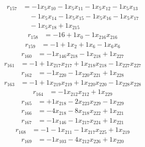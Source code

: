 \[\begin{aligned}
r_{157} &= - 1 x_{5} x_{10} - 1 x_{5} x_{11} - 1 x_{5} x_{12} - 1 x_{5} x_{13} \\
 &\quad - 1 x_{5} x_{14} - 1 x_{5} x_{15} - 1 x_{5} x_{16} - 1 x_{5} x_{17} \\
 &\quad - 1 x_{5} x_{18} + 1 x_{215}
\end{aligned}\]
\[\begin{aligned}
r_{158} &= - 16 + 1 x_{0} - 1 x_{216} x_{216}
\end{aligned}\]
\[\begin{aligned}
r_{159} &= - 1 + 1 x_{2} + 1 x_{6} - 1 x_{6} x_{6}
\end{aligned}\]
\[\begin{aligned}
r_{160} &= - 1 x_{146} x_{218} - 1 x_{218} + 1 x_{227}
\end{aligned}\]
\[\begin{aligned}
r_{161} &= - 1 + 1 x_{217} x_{217} + 1 x_{218} x_{218} - 1 x_{227} x_{227}
\end{aligned}\]
\[\begin{aligned}
r_{162} &= - 1 x_{220} - 1 x_{220} x_{221} + 1 x_{228}
\end{aligned}\]
\[\begin{aligned}
r_{163} &= - 1 + 1 x_{219} x_{219} + 1 x_{220} x_{220} - 1 x_{228} x_{228}
\end{aligned}\]
\[\begin{aligned}
r_{164} &= - 1 x_{212} x_{212} + 1 x_{229}
\end{aligned}\]
\[\begin{aligned}
r_{165} &= + 1 x_{218} - 2 x_{223} x_{229} - 1 x_{229}
\end{aligned}\]
\[\begin{aligned}
r_{166} &= - 4 x_{218} - 8 x_{218} x_{222} + 1 x_{221}
\end{aligned}\]
\[\begin{aligned}
r_{167} &= - 1 x_{146} - 1 x_{217} x_{224} + 1 x_{221}
\end{aligned}\]
\[\begin{aligned}
r_{168} &= - 1 - 1 x_{211} - 1 x_{217} x_{225} + 1 x_{219}
\end{aligned}\]
\[\begin{aligned}
r_{169} &= - 1 x_{103} - 4 x_{212} x_{226} + 1 x_{220}
\end{aligned}\]
